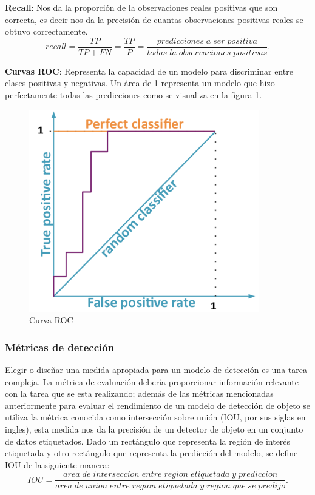 \textbf{Recall}: Nos da la proporción de la observaciones reales positivas que son correcta, es decir nos da la precisión de cuantas observaciones positivas reales se obtuvo correctamente.
\begin{equation}
recall = \frac{TP}{TP+FN} = \frac{TP}{P} = \frac{predicciones\;a\;ser\;positiva}{todas\;la\;observaciones\;positivas} .
\end{equation}

\textbf{Curvas ROC}: Representa la capacidad de un modelo para discriminar entre clases positivas y negativas. Un área de 1 representa un modelo que hizo perfectamente todas las predicciones como se visualiza en la figura \ref{Fig: roc}.
\begin{figure}[H]
 \centering
  \includegraphics[scale=0.6,keepaspectratio=true,clip=true]{imagenes/MarcoTeorico/curvas-roc.png}
  \caption{Curva ROC} \label{Fig: roc}
\end{figure}

\subsubsection*{Métricas de detección}\label{sub:metricas_de_deteccion}
Elegir o diseñar una medida apropiada para un modelo de detección es una tarea compleja. La métrica de evaluación debería proporcionar información relevante con la tarea que se esta realizando; además de las métricas mencionadas anteriormente para evaluar el rendimiento de un modelo de detección de objeto se utiliza la métrica conocida como intersección sobre unión (IOU, por sus siglas en ingles), esta medida nos da la precisión de un detector de objeto en un conjunto de datos etiquetados. Dado un rectángulo que representa la región de interés etiquetada y otro rectángulo que representa la predicción del modelo, se define IOU de la siguiente manera:
\begin{equation}
IOU = \frac{area\;de\;interseccion\;entre\;region\;etiquetada\;y\;prediccion}{area\;de\;union\;entre\;region\;etiquetada\;y\;region\;que\;se\;predijo}.
\end{equation}

